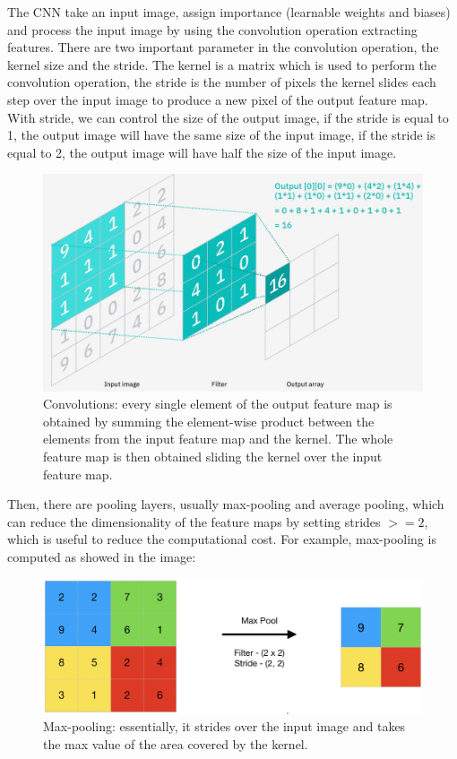 The CNN take an input image, assign importance (learnable weights and biases) and process the input image by using the convolution operation extracting features.
There are two important parameter in the convolution operation, the kernel size and the stride.
The kernel is a matrix which is used to perform the convolution operation, the stride is the number of pixels the kernel slides each step over the input image to produce a new pixel of the output feature map.
With stride, we can control the size of the output image, if the stride is equal to 1, the output image will have the same size of the input image, if the stride is equal to 2, the output image will have half the size of the input image.
\begin{figure}[H]
    \centering
    \includegraphics[width=\textwidth]{images/2_convolutions}
    \caption[Example of convolution]{Convolutions: every single element of the output feature map is obtained by summing the element-wise product between the elements from the input feature map and the kernel. The whole feature map is then obtained sliding the kernel over the input feature map.}
    \label{fig:figure-convolutions}
\end{figure}
Then, there are pooling layers, usually max-pooling and average pooling, which can reduce the dimensionality of the feature maps by setting strides $>=2$, which is useful to reduce the computational cost.
For example, max-pooling is computed as showed in the image:
\begin{figure}[H]
    \centering
    \includegraphics[width=\textwidth]{images/2_max_pooling}
    \caption[Example of max-pooling]{Max-pooling: essentially, it strides over the input image and takes the max value of the area covered by the kernel.}
    \label{fig:figure-max-pooling}
\end{figure}
